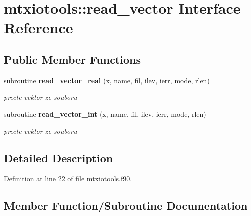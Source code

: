 \section{mtxiotools\+:\+:read\+\_\+vector Interface Reference}
\label{interfacemtxiotools_1_1read__vector}
\subsection*{Public Member Functions}
\begin{DoxyCompactItemize}
\item 
subroutine {\bf read\+\_\+vector\+\_\+real} (x, name, fil, ilev, ierr, mode, rlen)
\begin{DoxyCompactList}\small\item\em precte vektor ze souboru \end{DoxyCompactList}\item 
subroutine {\bf read\+\_\+vector\+\_\+int} (x, name, fil, ilev, ierr, mode, rlen)
\begin{DoxyCompactList}\small\item\em precte vektor ze souboru \end{DoxyCompactList}\end{DoxyCompactItemize}


\subsection{Detailed Description}


Definition at line 22 of file mtxiotools.\+f90.



\subsection{Member Function/\+Subroutine Documentation}

